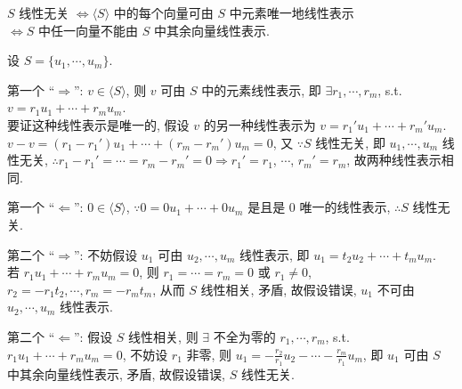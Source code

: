 \documentclass{note}
\begin{document}
\begin{thm}[(课本定理 1.6)]\label{thm-1.6}
    $S$ 线性无关 $\Longleftrightarrow\langle S\rangle$ 中的每个向量可由 $S$ 中元素唯一地线性表示\\
    $\Longleftrightarrow S$ 中任一向量不能由 $S$ 中其余向量线性表示.
\end{thm}
\begin{pf}
    设 $S=\{u_1,\cdots,u_m\}$.

    第一个 ``$\Longrightarrow$'': $v\in\langle S\rangle$, 则 $v$ 可由 $S$ 中的元素线性表示, 即 $\exists r_1,\cdots,r_m$, s.t. $v=r_1u_1+\cdots+r_mu_m$.\\
    要证这种线性表示是唯一的, 假设 $v$ 的另一种线性表示为 $v=r_1'u_1+\cdots+r_m'u_m$.\\
    $v-v=(r_1-r_1')u_1+\cdots+(r_m-r_m')u_m=0$, 又 $\because S$ 线性无关, 即 $u_1,\cdots,u_m$ 线性无关, $\therefore r_1-r_1'=\cdots=r_m-r_m'=0\Longrightarrow r_1'=r_1$, $\cdots$, $r_m'=r_m$, 故两种线性表示相同.

    第一个 ``$\Longleftarrow$'': $0\in\langle S\rangle$, $\because 0=0u_1+\cdots+0u_m$ 是且是 $0$ 唯一的线性表示, $\therefore S$ 线性无关.

    第二个 ``$\Longrightarrow$'': 不妨假设 $u_1$ 可由 $u_2,\cdots,u_m$ 线性表示, 即 $u_1=t_2u_2+\cdots+t_mu_m$.\\
    若 $r_1u_1+\cdots+r_mu_m=0$, 则 $r_1=\cdots=r_m=0$ 或 $r_1\neq 0$, $r_2=-r_1t_2,\cdots,r_m=-r_mt_m$, 从而 $S$ 线性相关, 矛盾, 故假设错误, $u_1$ 不可由 $u_2,\cdots,u_m$ 线性表示.

    第二个 ``$\Longleftarrow$'': 假设 $S$ 线性相关, 则 $\exists$ 不全为零的 $r_1,\cdots,r_m$, s.t. $r_1u_1+\cdots+r_mu_m=0$, 不妨设 $r_1$ 非零, 则 $u_1=-\frac{r_2}{r_1}u_2-\cdots-\frac{r_m}{r_1}u_m$, 即 $u_1$ 可由 $S$ 中其余向量线性表示, 矛盾, 故假设错误, $S$ 线性无关.
\end{pf}
\end{document}
